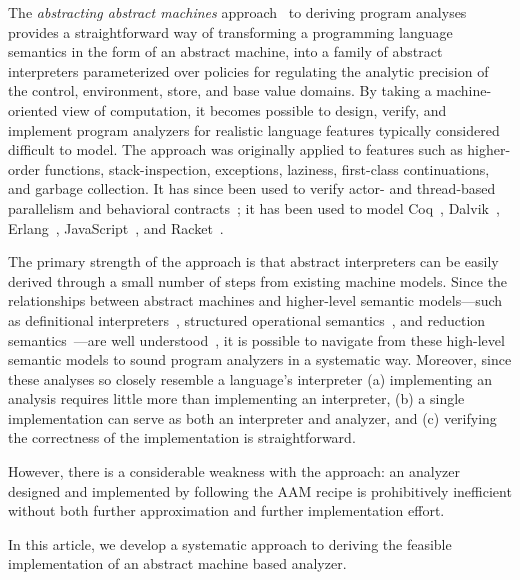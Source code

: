 \documentclass[preprint,onecolumn,9pt]{sigplanconf} %
\begin{document}
The \emph{abstracting abstract machines}
approach~\cite{dvanhorn:VanHorn2011Abstracting,dvanhorn:VanHorn2012Systematic}
to deriving program analyses provides a straightforward way of
transforming a programming language semantics in the form of an
abstract machine, into a family of abstract interpreters parameterized
over policies for regulating the analytic precision of the control,
environment, store, and base value domains.  By taking a
machine-oriented view of computation, it becomes possible to design,
verify, and implement program analyzers for realistic language
features typically considered difficult to model.  The approach was
originally applied to features such as higher-order functions,
stack-inspection, exceptions, laziness, first-class continuations, and
garbage collection.  It has since been used to verify actor-
\cite{local:DOsualdo:12A} and
thread-based~\cite{dvanhorn:Might2011Family} parallelism and
behavioral contracts~\cite{dvanhorn:TobinHochstadt2012Higherorder}; it
has been used to model Coq~\cite{local:harvard},
Dalvik~\cite{local:dalvik}, Erlang~\cite{local:DOsualdo:12B},
JavaScript~\cite{local:DBLP:journals/corr/abs-1109-4467}, and
Racket~\cite{dvanhorn:TobinHochstadt2012Higherorder}.

The primary strength of the approach is that abstract interpreters can
be easily derived through a small number of steps from existing
machine models.  Since the relationships between abstract machines and
higher-level semantic models---such as definitional
interpreters~\cite{dvanhorn:reynolds-hosc98}, structured operational
semantics~\cite{dvanhorn:Plotkin1981Structural}, and reduction
semantics~\cite{dvanhorn:Felleisen2009Semantics}---are well
understood~\cite{dvanhorn:Danvy:DSc}, it is possible to navigate from
these high-level semantic models to sound program analyzers in a
systematic way.  Moreover, since these analyses so closely resemble a
language's interpreter (a) implementing an analysis requires little
more than implementing an interpreter, (b) a single implementation can
serve as both an interpreter and analyzer, and (c) verifying the
correctness of the implementation is straightforward.

However, there is a considerable weakness with the approach: an
analyzer designed and implemented by following the AAM recipe is
prohibitively inefficient without both further approximation and
further implementation effort.

In this article, we develop a systematic approach to deriving the
feasible implementation of an abstract machine based analyzer.
\end{document}
